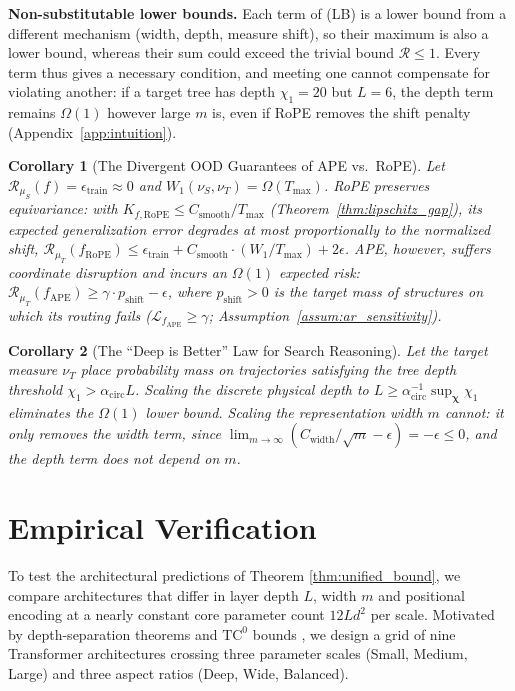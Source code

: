 \documentclass{article}
\newtheorem{corollary}{Corollary}
\begin{document}
\textbf{Non-substitutable lower bounds.} %
Each term of (LB) is a lower bound from a different mechanism (width, depth, measure shift), so their maximum is also a lower bound, whereas their sum could exceed the trivial bound $\mathcal{R}\le 1$. Every term thus gives a necessary condition, and meeting one cannot compensate for violating another: if a target tree has depth $\chi_1=20$ but $L=6$, the depth term remains $\Omega(1)$ however large $m$ is, even if RoPE removes the shift penalty (Appendix~\ref{app:intuition}).

\begin{corollary}[The Divergent OOD Guarantees of APE vs.\ RoPE]
\label{cor:ape_vs_rope}
Let $\mathcal{R}_{\mu_S}(f) = \epsilon_{\mathrm{train}} \approx 0$ and $W_1(\nu_S, \nu_T) = \Omega(T_{\max})$. RoPE preserves equivariance: with $K_{f,\mathrm{RoPE}}\le C_{\mathrm{smooth}}/T_{\max}$ (Theorem~\ref{thm:lipschitz_gap}), its expected generalization error degrades at most proportionally to the normalized shift, $\mathcal{R}_{\mu_T}(f_{\mathrm{RoPE}}) \le \epsilon_{\mathrm{train}} + C_{\mathrm{smooth}} \cdot (W_1 / T_{\max}) + 2\epsilon$. APE, however, suffers coordinate disruption and incurs an $\Omega(1)$ expected risk: $\mathcal{R}_{\mu_T}(f_{\mathrm{APE}}) \ge \gamma \cdot p_{\mathrm{shift}} - \epsilon$, where $p_{\mathrm{shift}}>0$ is the target mass of structures on which its routing fails ($\mathcal{L}_{f_{\mathrm{APE}}}\ge\gamma$; Assumption~\ref{assum:ar_sensitivity}).
\end{corollary}

\begin{corollary}[The ``Deep is Better'' Law for Search Reasoning]
\label{cor:deep_is_better}
Let the target measure $\nu_T$ place probability mass on trajectories satisfying the tree depth threshold $\chi_1 > \alpha_{\mathrm{circ}} L$. Scaling the discrete physical depth to $L \ge \alpha_{\mathrm{circ}}^{-1} \sup_{\boldsymbol{\chi}} \chi_1$ eliminates the $\Omega(1)$ lower bound. Scaling the representation width $m$ cannot: it only removes the width term, since $\lim_{m \to \infty} (C_{\mathrm{width}} / \sqrt{m} - \epsilon) = -\epsilon \le 0$, and the depth term does not depend on $m$.
\end{corollary}

\section{Empirical Verification}
\label{sec:experiments}

To test the architectural predictions of Theorem \ref{thm:unified_bound}, we compare architectures that differ in layer depth $L$, width $m$ and positional encoding at a nearly constant core parameter count $12Ld^2$ per scale. Motivated by depth-separation theorems \citep{eldan2016powerdepthfeedforwardneural, levine2021depthtowidthinterplayselfattention} and $\text{TC}^0$ bounds \citep{merrill2023parallelismtradeofflimitationslogprecision}, we design a grid of nine Transformer architectures crossing three parameter scales (Small, Medium, Large) and three aspect ratios (Deep, Wide, Balanced).
\end{document}
